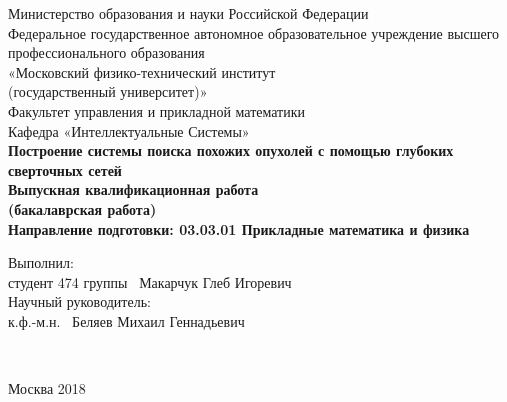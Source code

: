 \begin{titlepage}
{
\renewcommand{\baselinestretch}{1}
\thispagestyle{empty}
\begin{center}
    \sc
        Министерство образования и науки Российской Федерации\\
        \bigskip
        Федеральное государственное автономное образовательное учреждение высшего профессионального образования \\
        «Московский физико-технический институт \\
{\rm(государственный университет)}»\\
		\bigskip
        Факультет управления и прикладной математики\\
        \bigskip
        Кафедра «Интеллектуальные Системы»\\[35mm]
    \bf\Large
        Построение системы поиска похожих опухолей с помощью глубоких сверточных сетей \\[5mm]
    \bigskip
    \rm\normalsize
    	Выпускная квалификационная работа\\
    	 (бакалаврская работа)\\
  	\bigskip
    \rm\normalsize
       Направление подготовки: 03.03.01 Прикладные математика и физика\\[10mm]
        
       \begin{flushleft}
       Выполнил:\\
студент 474 группы \underline{\hspace{2.0in}} \, Макарчук Глеб Игоревич\\[5mm]


Научный руководитель:\\
к.ф.-м.н.  \hspace{0.85in} \underline{\hspace{2.0in}} \, Беляев Михаил Геннадьевич\\[35mm]

		\end{flushleft}
\end{center}

\


\begin{center}
    Москва 2018
\end{center}
}
\end{titlepage}
